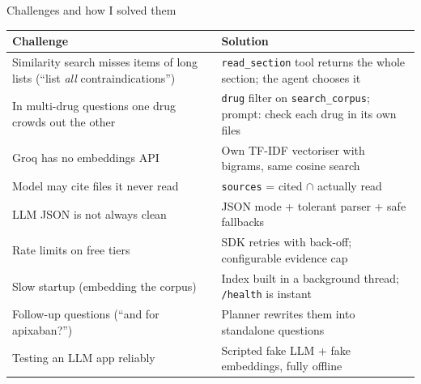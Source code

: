\documentclass[aspectratio=169,11pt]{beamer}
\begin{document}
\begin{frame}{Challenges and how I solved them}
  \footnotesize
  \renewcommand{\arraystretch}{1.18}
  \begin{tabularx}{\textwidth}{@{}>{\raggedright\arraybackslash}p{} X@{}}
    \toprule
    \textbf{Challenge} & \textbf{Solution} \\
    \midrule
    Similarity search misses items of long lists (``list \emph{all} contraindications'') & \texttt{read\_section} tool returns the whole section; the agent chooses it \\
    In multi-drug questions one drug crowds out the other & \texttt{drug} filter on \texttt{search\_corpus}; prompt: check each drug in its own files \\
    Groq has no embeddings API & Own TF-IDF vectoriser with bigrams, same cosine search \\
    Model may cite files it never read & \texttt{sources} = cited $\cap$ actually read \\
    LLM JSON is not always clean & JSON mode + tolerant parser + safe fallbacks \\
    Rate limits on free tiers & SDK retries with back-off; configurable evidence cap \\
    Slow startup (embedding the corpus) & Index built in a background thread; \texttt{/health} is instant \\
    Follow-up questions (``and for apixaban?'') & Planner rewrites them into standalone questions \\
    Testing an LLM app reliably & Scripted fake LLM + fake embeddings, fully offline \\
    \bottomrule
  \end{tabularx}
\end{frame}
\end{document}
